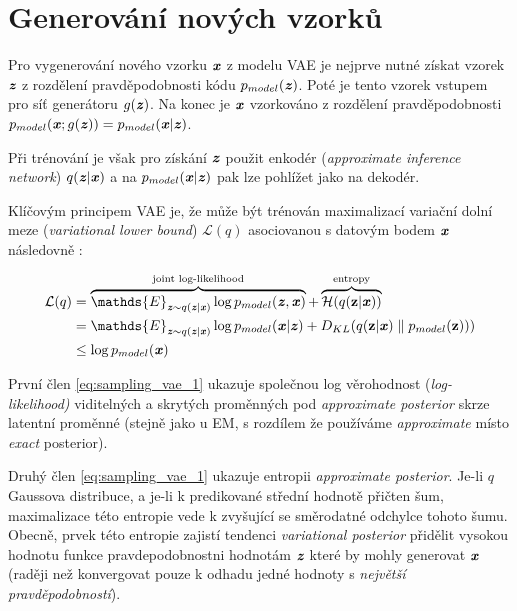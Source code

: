 \section{Generování nových vzorků}
\label{sec:vae_generating_new_data}
Pro vygenerování nového vzorku $\textbf{\emph{x}}$ z modelu VAE je nejprve nutné získat vzorek $\textbf{\emph{z}}$ z rozdělení pravděpodobnosti kódu $p_{model}(\textbf{\emph{z}})$.
Poté je tento vzorek vstupem pro síť generátoru $g(\textbf{\emph{z}})$. Na konec je $\textbf{\emph{x}}$ vzorkováno z rozdělení pravděpodobnosti $p_{model}(\textbf{\emph{x}};g(\textbf{\emph{z}})) = p_{model}(\textbf{\emph{x}}\mid\textbf{\emph{z}})$. \cite{Kingma2014}

Při trénování je však pro získání $\textbf{\emph{z}}$ použit enkodér (\emph{approximate inference network}) $q(\textbf{\emph{z}}\mid\textbf{\emph{x}})$ a na $p_{model}(\textbf{\emph{x}}\mid\textbf{\emph{z}})$ pak lze pohlížet jako na dekodér. \cite{Kingma2014}

Klíčovým principem VAE je, že může být trénován maximalizací variační dolní meze (\emph{variational lower bound}) $\mathcal{L}(q)$ asociovanou s datovým bodem $\textbf{\emph{x}}$ následovně \cite{Goodfellow2016}: 

\begin{align}
    \mathcal{L}(q) &= \overbrace{ \mathds{E}_{\textbf{\emph{z}} \sim q(\textbf{\emph{z}}\mid\textbf{\emph{x}})} \log p_{model}(\textbf{\emph{z}}, \textbf{\emph{x}}) }^\text{joint log-likelihood} + \overbrace{ \mathcal{H}(q(\textbf{z} \mid \textbf{\emph{x}})) }^\text{entropy} \label{eq:sampling_vae_1} \\
    &= \mathds{E}_{\textbf{\emph{z}} \sim q(\textbf{\emph{z}}\mid\textbf{\emph{x}})} \log p_{model}(\textbf{\emph{x}}\mid\textbf{\emph{z}}) + D_{KL}(q(\textbf{z} \mid \textbf{\emph{x}})\parallel p_{model}(\textbf{z}))) \label{eq:sampling_vae_2} \\
    &\leq \log p_{model}(\textbf{\emph{x}})
\end{align}

První člen \autoref{eq:sampling_vae_1} ukazuje společnou log věrohodnost (\emph{log-likelihood)} viditelných a skrytých proměnných pod \emph{approximate posterior} skrze latentní proměnné (stejně jako u EM, s rozdílem že používáme \emph{approximate} místo \emph{exact} posterior). \cite{Goodfellow2016}

Druhý člen \autoref{eq:sampling_vae_1} ukazuje entropii \emph{approximate posterior}.
Je-li $q$ Gaussova distribuce, a je-li k predikované střední hodnotě přičten šum, maximalizace této entropie vede k zvyšující se směrodatné odchylce tohoto šumu.
Obecně, prvek této entropie zajistí tendenci \emph{variational posterior} přidělit vysokou hodnotu funkce pravdepodobnostni hodnotám $\textbf{\emph{z}}$ které by mohly generovat $\textbf{\emph{x}}$ (raději než konvergovat pouze k odhadu jedné hodnoty s \emph{největší pravděpodobností}). \cite{Goodfellow2016}

